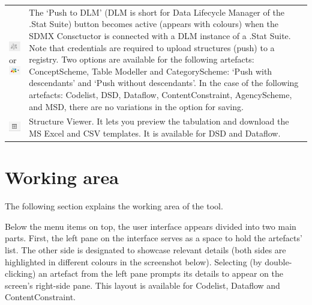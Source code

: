 \documentclass[
]{book}
\begin{document}
\begin{longtable}[]{@{}
  >{\raggedright\arraybackslash}p{}
  >{\raggedright\arraybackslash}p{}@{}}
\includegraphics{images/image037.png} or \includegraphics{images/image038.png} & The `Push to DLM' (DLM is short for Data Lifecycle Manager of the .Stat Suite) button becomes active (appears with colours) when the SDMX Consctuctor is connected with a DLM instance of a .Stat Suite. Note that credentials are required to upload structures (push) to a registry. Two options are available for the following artefacts: ConceptScheme, Table Modeller and CategoryScheme: `Push with descendants' and `Push without descendants'. In the case of the following artefacts: Codelist, DSD, Dataflow, ContentConstraint, AgencyScheme, and MSD, there are no variations in the option for saving. \\
\includegraphics{images/image039.png} & Structure Viewer. It lets you preview the tabulation and download the MS Excel and CSV templates. It is available for DSD and Dataflow. \\
\end{longtable}

\hypertarget{working-area}{%
\section{Working area}\label{working-area}}

The following section explains the working area of the tool.

Below the menu items on top, the user interface appears divided into two main parts. First, the left pane on the interface serves as a space to hold the artefacts' list. The other side is designated to showcase relevant details (both sides are highlighted in different colours in the screenshot below). Selecting (by double-clicking) an artefact from the left pane prompts its details to appear on the screen's right-side pane. This layout is available for Codelist, Dataflow and ContentConstraint.
\end{document}
